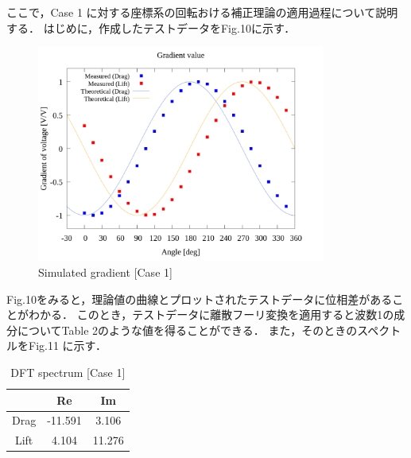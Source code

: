 ここで，Case 1 に対する座標系の回転おける補正理論の適用過程について説明する．
はじめに，作成したテストデータをFig.10に示す．

\begin{figure}[htbp]

  \begin{center}
    \includegraphics[width=95mm]{../../02_workspace/result/rotation_tx=15.0_ty=20.0/plot/20/20_adjust-value.png}
    \caption{Simulated gradient [Case 1]}
  \end{center}
\end{figure}

\newpage

Fig.10をみると，理論値の曲線とプロットされたテストデータに位相差があることがわかる．
このとき，テストデータに離散フーリ変換を適用すると波数1の成分についてTable 2のような値を得ることができる．
また，そのときのスペクトルをFig.11 に示す．

\begin{table}[htbp]
  \begin{center}
    \caption{DFT spectrum [Case 1]}
    \begin{tabular}{|p{30mm}|p{20mm}|p{20mm}|}
      \hline
      \multicolumn{1}{|c|}{}     & \multicolumn{1}{|c|}{Re}      & \multicolumn{1}{|c|}{Im}     \\ \hline
      \multicolumn{1}{|c|}{Drag} & \multicolumn{1}{|c|}{-11.591} & \multicolumn{1}{|c|}{3.106}  \\ \hline
      \multicolumn{1}{|c|}{Lift} & \multicolumn{1}{|c|}{4.104}   & \multicolumn{1}{|c|}{11.276} \\ \hline
    \end{tabular}
  \end{center}
\end{table}

